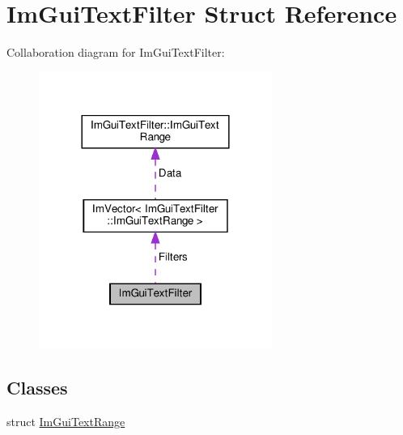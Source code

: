 \hypertarget{structImGuiTextFilter}{}\section{Im\+Gui\+Text\+Filter Struct Reference}
\label{structImGuiTextFilter}


Collaboration diagram for Im\+Gui\+Text\+Filter\+:\nopagebreak
\begin{figure}[H]
\begin{center}
\leavevmode
\includegraphics[width=216pt]{structImGuiTextFilter__coll__graph}
\end{center}
\end{figure}
\subsection*{Classes}
\begin{DoxyCompactItemize}
\item 
struct \hyperlink{structImGuiTextFilter_1_1ImGuiTextRange}{Im\+Gui\+Text\+Range}
\end{DoxyCompactItemize}
